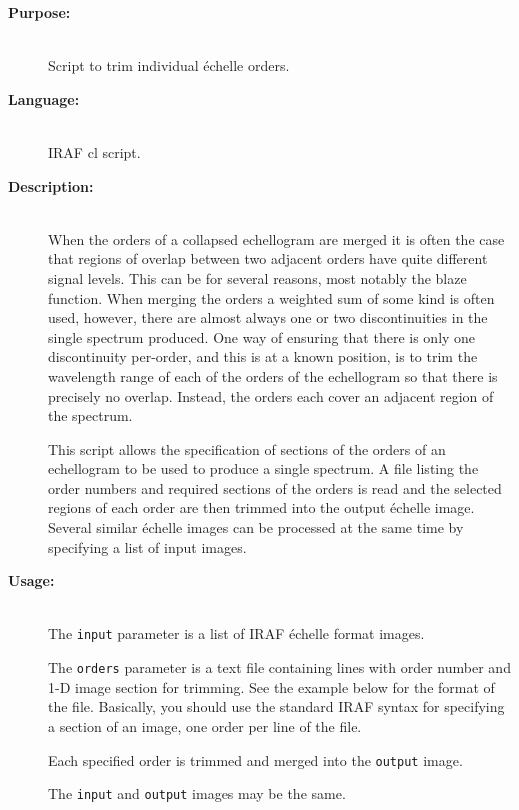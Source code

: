 \documentclass[twoside,11pt]{starlink}
\begin{document}
\begin{description}

\item [\textbf{Purpose:}] \mbox{} \\
     Script to trim individual \'{e}chelle orders.

\item [\textbf{Language:}] \mbox{} \\
     IRAF cl script.

\item [\textbf{Description:}] \mbox{} \\
     When the orders of a collapsed echellogram are merged it is
     often the case that regions of overlap between two adjacent
     orders have quite different signal levels.  This can be for
     several reasons, most notably the blaze function.  When merging
     the orders a weighted sum of some kind is often used, however,
     there are almost always one or two discontinuities in the single
     spectrum produced.  One way of ensuring that there is only one
     discontinuity per-order, and this is at a known position, is
     to trim the wavelength range of each of the orders of the
     echellogram so that there is precisely no overlap.  Instead,
     the orders each cover an adjacent region of the spectrum.

     This script allows the specification of sections of the orders
     of an echellogram to be used to produce a single spectrum.
     A file listing the order numbers and required sections of the
     orders is read and the selected regions of each order are then
     trimmed into the output \'{e}chelle image.  Several similar \'{e}chelle
     images can be processed at the same time by specifying a list
     of input images.

\item [\textbf{Usage:}] \mbox{} \\
     The \verb+input+ parameter is a list of IRAF \'{e}chelle format images.

     The \verb+orders+ parameter is a text file containing lines with order
     number and 1-D image section for trimming.  See the example below
     for the format of the file.  Basically, you should use the standard
     IRAF syntax for specifying a section of an image, one order per line
     of the file.

     Each specified order is trimmed and merged into the \verb+output+ image.

     The \verb+input+ and \verb+output+ images may be the same.


\end{description}
\end{document}
